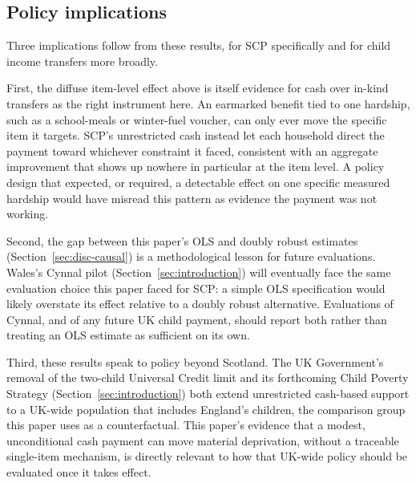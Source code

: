 \subsection{Policy implications}
\label{sec:disc-policy}
 
Three implications follow from these results, for SCP specifically and for child income transfers more broadly.
 
First, the diffuse item-level effect above is itself evidence for cash over in-kind transfers as the right instrument here. An earmarked benefit tied to one hardship, such as a school-meals or winter-fuel voucher, can only ever move the specific item it targets. SCP's unrestricted cash instead let each household direct the payment toward whichever constraint it faced, consistent with an aggregate improvement that shows up nowhere in particular at the item level. A policy design that expected, or required, a detectable effect on one specific measured hardship would have misread this pattern as evidence the payment was not working.
 
Second, the gap between this paper's OLS and doubly robust estimates (Section~\ref{sec:disc-causal}) is a methodological lesson for future evaluations. Wales's Cynnal pilot (Section~\ref{sec:introduction}) will eventually face the same evaluation choice this paper faced for SCP: a simple OLS specification would likely overstate its effect relative to a doubly robust alternative. Evaluations of Cynnal, and of any future UK child payment, should report both rather than treating an OLS estimate as sufficient on its own.
 
Third, these results speak to policy beyond Scotland. The UK Government's removal of the two-child Universal Credit limit and its forthcoming Child Poverty Strategy (Section~\ref{sec:introduction}) both extend unrestricted cash-based support to a UK-wide population that includes England's children, the comparison group this paper uses as a counterfactual. This paper's evidence that a modest, unconditional cash payment can move material deprivation, without a traceable single-item mechanism, is directly relevant to how that UK-wide policy should be evaluated once it takes effect.